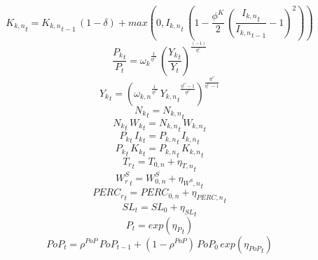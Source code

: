 \begin{dmath}
{{K_{k,n}}_{t}}={{K_{k,n}}_{t-1}}\, \left(1-{{\delta}}\right)+max(0,{{I_{k,n}}_{t}}\, \left(1-\frac{{{\phi^{K}}}}{2}\, \left(\frac{{{I_{k,n}}_{t}}}{{{I_{k,n}}_{t-1}}}-1\right)^{2}\right))
\end{dmath}
\begin{dmath}
\frac{{{P_k}_{t}}}{{P_{t}}}={{\omega_{k}}}^{\frac{1}{{{\eta^{C}}}}}\, \left(\frac{{{Y_k}_{t}}}{{Y_{t}}}\right)^{\frac{\left(-1\right)}{{{\eta^{C}}}}}
\end{dmath}
\begin{dmath}
{{Y_k}_{t}}=\left({{\omega_{k,n}}}^{\frac{1}{{{\eta^{C}}}}}\, {{Y_{k,n}}_{t}}^{\frac{{{\eta^{C}}}-1}{{{\eta^{C}}}}}\right)^{\frac{{{\eta^{C}}}}{{{\eta^{C}}}-1}}
\end{dmath}
\begin{dmath}
{{N_k}_{t}}={{N_{k,n}}_{t}}
\end{dmath}
\begin{dmath}
{{N_k}_{t}}\, {{W_k}_{t}}={{N_{k,n}}_{t}}\, {{W_{k,n}}_{t}}
\end{dmath}
\begin{dmath}
{{P_k}_{t}}\, {{I_k}_{t}}={{P_{k,n}}_{t}}\, {{I_{k,n}}_{t}}
\end{dmath}
\begin{dmath}
{{P_k}_{t}}\, {{K_k}_{t}}={{P_{k,n}}_{t}}\, {{K_{k,n}}_{t}}
\end{dmath}
\begin{dmath}
{{T_{r}}_{t}}={{T_{0,n}}}+{{\eta_{T,n}}_{t}}
\end{dmath}
\begin{dmath}
{{W_{r}^{S}}_{t}}={{W^{S}_{0,n}}}+{{\eta_{W^{S},n}}_{t}}
\end{dmath}
\begin{dmath}
{{PERC_{r}}_{t}}={{PERC_{0,n}}}+{{\eta_{PERC,n}}_{t}}
\end{dmath}
\begin{dmath}
{{SL}_{t}}={{SL_0}}+{{\eta_{SL}}_{t}}
\end{dmath}
\begin{dmath}
{P_{t}}=exp\left({{\eta_{P}}_{t}}\right)
\end{dmath}
\begin{dmath}
{PoP_{t}}={{\rho^{PoP}}}\, {PoP_{t-1}}+\left(1-{{\rho^{PoP}}}\right)\, {{PoP_0}}\, exp\left({{\eta_{PoP}}_{t}}\right)
\end{dmath}

